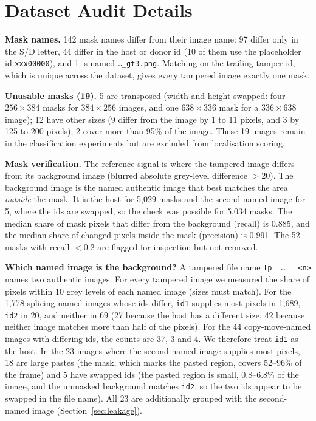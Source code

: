 \section{Dataset Audit Details}\label{app:dataset}

\textbf{Mask names.} 142 mask names differ from their image name: 97 differ only in the S/D letter, 44 differ in the
host or donor id (10 of them use the placeholder id \texttt{xxx00000}), and 1 is named \texttt{\ldots\_gt3.png}.
Matching on the trailing tamper id, which is unique across the dataset, gives every tampered image exactly one mask.

\textbf{Unusable masks (19).} 5 are transposed (width and height swapped: four $256\times384$ masks for
$384\times256$ images, and one $638\times336$ mask for a $336\times638$ image); 12 have other sizes (9 differ from the
image by 1 to 11 pixels, and 3 by 125 to 200 pixels); 2 cover more than 95\% of the image. These 19 images remain in
the classification experiments but are excluded from localisation scoring.

\textbf{Mask verification.} The reference signal is where the tampered image differs from its background image
(blurred absolute grey-level difference $>20$). The background image is the named authentic image that best matches
the area \emph{outside} the mask. It is the host for 5,029 masks and the second-named image for 5, where the ids are
swapped, so the check was possible for 5,034 masks. The median share of mask pixels that differ from the background
(recall) is 0.885, and the median share of changed pixels inside the mask (precision) is 0.991. The 52 masks with
recall $<0.2$ are flagged for inspection but not removed.

\textbf{Which named image is the background?} A tampered file name
\texttt{Tp\_<S|D>\_\ldots\_<id1>\_<id2>\_<n>} names two authentic images. For every tampered image we measured the
share of pixels within 10 grey levels of each named image (sizes must match). For the 1,778 splicing-named images
whose ids differ, \texttt{id1} supplies most pixels in 1,689, \texttt{id2} in 20, and neither in 69 (27 because the
host has a different size, 42 because neither image matches more than half of the pixels). For the 44
copy-move-named images with differing ids, the counts are 37, 3 and 4. We therefore treat \texttt{id1} as the host.
In the 23 images where the second-named image supplies most pixels, 18 are large pastes (the mask, which marks the
pasted region, covers 52--96\% of the frame) and 5 have swapped ids (the pasted region is small, 0.8--6.8\% of the
image, and the unmasked background matches \texttt{id2}, so the two ids appear to be swapped in the file name). All
23 are additionally grouped with the second-named image (Section~\ref{sec:leakage}).
